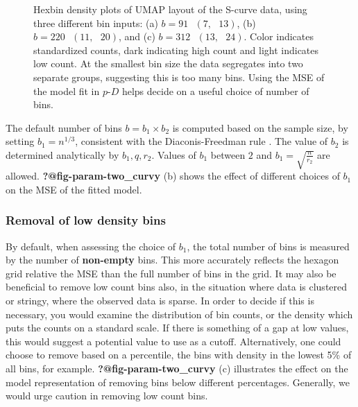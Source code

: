 \documentclass[
  12pt]{article}
\begin{document}
\begin{figure}[H]


\caption{\label{fig-bins-two-curvy}Hexbin density plots of UMAP layout
of the S-curve data, using three different bin inputs: (a)
\(b = 91 \text{ } (7, \text{ }13)\), (b)
\(b = 220 \text{ } (11, \text{ }20)\), and (c)
\(b = 312 \text{ } (13, \text{ }24)\). Color indicates standardized
counts, dark indicating high count and light indicates low count. At the
smallest bin size the data segregates into two separate groups,
suggesting this is too many bins. Using the MSE of the model fit in
\(p\text{-}D\) helps decide on a useful choice of number of bins.}

\end{figure}%

The default number of bins \(b=b_1\times b_2\) is computed based on the
sample size, by setting \(b_1=n^{1/3}\), consistent with the
Diaconis-Freedman rule \citep{freedman1981}. The value of \(b_2\) is
determined analytically by \(b_1, q, r_2\). Values of \(b_1\) between
\(2\) and \(b_1 = \sqrt{\frac{n}{r_2}}\) are allowed.
\textbf{?@fig-param-two\_curvy} (b) shows the effect of different
choices of \(b_1\) on the MSE of the fitted model.

\subsubsection{Removal of low density
bins}\label{removal-of-low-density-bins}

By default, when assessing the choice of \(b_1\), the total number of
bins is measured by the number of \textbf{non-empty} bins. This more
accurately reflects the hexagon grid relative the MSE than the full
number of bins in the grid. It may also be beneficial to remove low
count bins also, in the situation where data is clustered or stringy,
where the observed data is sparse. In order to decide if this is
necessary, you would examine the distribution of bin counts, or the
density which puts the counts on a standard scale. If there is something
of a gap at low values, this would suggest a potential value to use as a
cutoff. Alternatively, one could choose to remove based on a percentile,
the bins with density in the lowest 5\% of all bins, for example.
\textbf{?@fig-param-two\_curvy} (c) illustrates the effect on the model
representation of removing bins below different percentages. Generally,
we would urge caution in removing low count bins.
\end{document}
